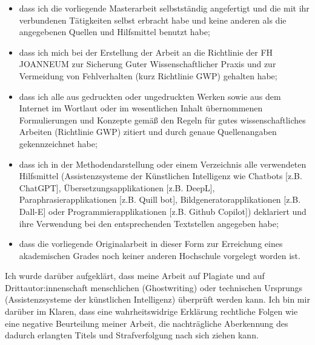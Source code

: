 {    \begin{itemize}
        \item dass ich die vorliegende Masterarbeit selbstständig angefertigt und die mit ihr verbundenen Tätigkeiten selbst erbracht habe und keine anderen als die angegebenen Quellen und Hilfsmittel benutzt habe;
        \item dass ich mich bei der Erstellung der Arbeit an die Richtlinie der FH JOANNEUM zur Sicherung Guter Wissenschaftlicher Praxis und zur Vermeidung von Fehlverhalten (kurz Richtlinie GWP) gehalten habe;
        \item dass ich alle aus gedruckten oder ungedruckten Werken sowie aus dem Internet im Wortlaut oder im wesentlichen Inhalt übernommenen Formulierungen und Konzepte gemäß den Regeln für gutes wissenschaftliches Arbeiten (Richtlinie GWP) zitiert und durch genaue Quellenangaben gekennzeichnet habe;
        \item dass ich in der Methodendarstellung oder einem Verzeichnis alle verwendeten Hilfsmittel (Assistenzsysteme der Künstlichen Intelligenz wie Chatbots [z.B. ChatGPT], Übersetzungsapplikationen [z.B. DeepL], Paraphrasierapplikationen [z.B. Quill bot], Bildgeneratorapplikationen [z.B. Dall-E] oder Programmierapplikationen [z.B. Github Copilot]) deklariert und ihre Verwendung bei den entsprechenden Textstellen angegeben habe;
        \item dass die vorliegende Originalarbeit in dieser Form zur Erreichung eines akademischen Grades noch keiner anderen Hochschule vorgelegt worden ist.
    \end{itemize}

    Ich wurde darüber aufgeklärt, dass meine Arbeit auf Plagiate und auf Drittautor:innenschaft menschlichen (Ghostwriting) oder technischen Ursprungs (Assistenzsysteme der künstlichen Intelligenz) überprüft werden kann. Ich bin mir darüber im Klaren, dass eine wahrheitswidrige Erklärung rechtliche Folgen wie eine negative Beurteilung meiner Arbeit, die nachträgliche Aberkennung des dadurch erlangten Titels und Strafverfolgung nach sich ziehen kann.

}